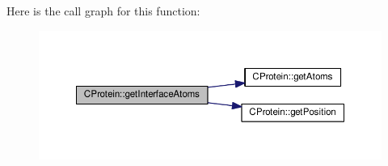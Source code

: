 Here is the call graph for this function\-:
\nopagebreak
\begin{figure}[H]
\begin{center}
\leavevmode
\includegraphics[width=350pt]{classCProtein_a2e38b7c42c30f967591fafb5060bc4f7_cgraph}
\end{center}
\end{figure}


